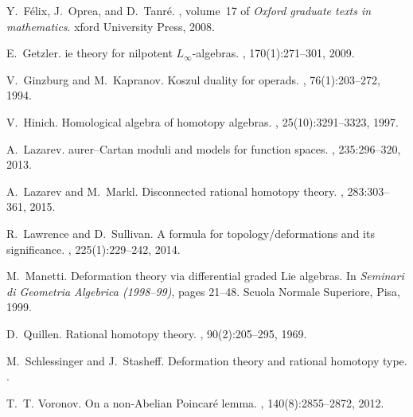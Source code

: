 \documentclass[a4paper,reqno]{amsart}
\theoremstyle{plain}
\theoremstyle{definition}
\theoremstyle{remark}
\begin{document}
\begin{thebibliography}{BM13b}
    Y.~F{\'e}lix, J.~Oprea, and D.~Tanr{\'e}.
    , volume~17 of {\em {O}xford
    graduate texts in mathematics}.
    xford University Press, 2008.

    E.~Getzler.
    ie theory for nilpotent {$L_{\infty}$}-algebras.
    , 170(1):271--301, 2009.
    \newblock

    V.~Ginzburg and M.~Kapranov.
    \newblock Koszul duality for operads.
    , 76(1):203--272, 1994.
    \newblock

    V.~Hinich.
    \newblock Homological algebra of homotopy algebras.
    , 25(10):3291--3323, 1997.
    \newblock

    A.~Lazarev.
    aurer--{C}artan moduli and models for function spaces.
    , 235:296--320, 2013.
    \newblock

    A.~Lazarev and M.~Markl.
    \newblock Disconnected rational homotopy theory.
    , 283:303--361, 2015.
    \newblock

    R.~Lawrence and D.~Sullivan.
    \newblock A formula for topology/deformations and its significance.
    , 225(1):229--242, 2014.
    \newblock

    M.~Manetti.
    \newblock Deformation theory via differential graded {L}ie algebras.
    \newblock In {\em Seminari di Geometria Algebrica (1998--99)}, pages 21--48.
    Scuola Normale Superiore, Pisa, 1999.

    D.~Quillen.
    \newblock Rational homotopy theory.
    , 90(2):205--295, 1969.
    \newblock

    M.~Schlessinger and J.~Stasheff.
    \newblock Deformation theory and rational homotopy type.
    \newblock \href {http://arxiv.org/abs/1211.1647} {}.

    T.~T. Voronov.
    \newblock On a non-{A}belian {P}oincar{\'e} lemma.
    ,
    140(8):2855--2872, 2012.
    \newblock

\end{thebibliography}

\setlength{\parindent}{0pt}
\end{document}
